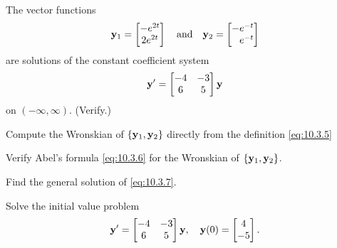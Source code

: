 \begin{example}\label{example:10.3.2}
The vector functions
\[
\mathbf{y}_1=\begin{bmatrix}-e^{2t}\\2e^{2t}\end{bmatrix} \quad\text{and}\quad 
\mathbf{y}_2=\begin{bmatrix}-e^{-t}\\\phantom{-}e^{-t}\end{bmatrix}
\]
are solutions of the constant coefficient system
\begin{equation} \label{eq:10.3.7}
\mathbf{y}'=\begin{bmatrix}-4&-3\\6&5\end{bmatrix} \mathbf{y}
\end{equation}
on $(-\infty,\infty)$.  (Verify.)
\begin{alist}
\item %
Compute the Wronskian of $\{\mathbf{y}_1,\mathbf{y}_2\}$
directly from the definition \eqref{eq:10.3.5}
\item %
Verify Abel's formula \eqref{eq:10.3.6} for the Wronskian of
$\{\mathbf{y}_1,\mathbf{y}_2\}$.
\item %
Find the general solution of \eqref{eq:10.3.7}.
\item %
 Solve the initial value problem
\begin{equation} \label{eq:10.3.8}
\mathbf{y}'=\begin{bmatrix}-4&-3\\6&5\end{bmatrix} \mathbf{y}, \quad \mathbf{y}(0)=
\begin{bmatrix} 4 \\-5\end{bmatrix}.
\end{equation}
\end{alist}
\end{example}

